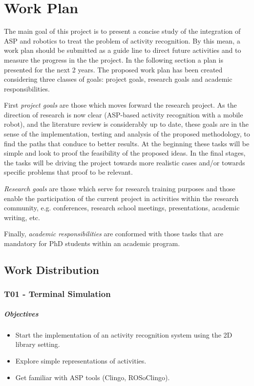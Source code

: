 \chapter{Work Plan}\label{ch_wp}

The main goal of this project is to present a concise study of the integration of ASP and robotics to treat the problem of activity recognition.
By this mean, a work plan should be submitted as a guide line to direct future activities and to measure the progress in the the project. In the following section a plan is presented for the next 2 years. The proposed work plan has been created considering three classes of goals: project goals, research goals and academic responsibilities.

First \textit{project goals} are those which moves forward the research project. 
As the direction of research is now clear (ASP-based activity recognition with a mobile robot), and the literature review is considerably up to date, these goals are in the sense of the implementation, testing and analysis of the proposed methodology, to find the paths that conduce to better results. 
At the beginning these tasks will be simple and look to proof the feasibility of the proposed ideas. 
In the final stages, the tasks will be driving the project towards more realistic cases and/or towards specific problems that proof to be relevant.

\textit{Research goals} are those which serve for research training purposes and those enable the participation of the current project in activities within the research community, e.g. conferences, research school meetings, presentations, academic writing, etc.

Finally, \textit{academic responsibilities} are conformed with those tasks that are mandatory for PhD students within an academic program.

\section{Work Distribution}

\subsection*{T01 - Terminal Simulation}
\paragraph{Objectives}
\begin{itemize}
\item Start the implementation of an activity recognition system using the 2D library setting.
\item Explore simple representations of activities.
\item Get familiar with ASP tools (Clingo, ROSoClingo).
\end{itemize}
